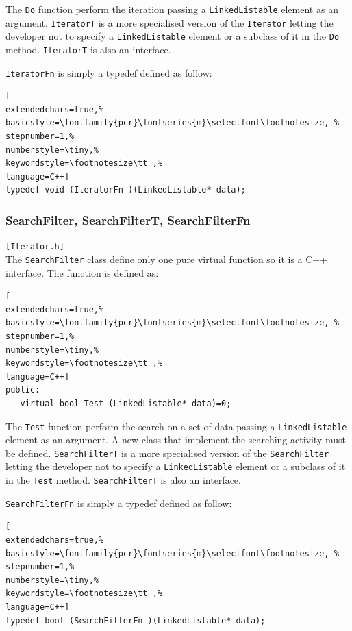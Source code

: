 The \texttt{Do} function perform the iteration passing a \texttt{LinkedListable} element as an argument. 
\texttt{IteratorT} is a more specialised version of the \texttt{Iterator} letting the developer not to specify a \texttt{LinkedListable} element or a subclass of it in the \texttt{Do} method. \texttt{IteratorT} is also an interface.

\texttt{IteratorFn} is simply a typedef defined as follow:

\begin{lstlisting}[
extendedchars=true,%
basicstyle=\fontfamily{pcr}\fontseries{m}\selectfont\footnotesize, %
stepnumber=1,%
numberstyle=\tiny,%
keywordstyle=\footnotesize\tt ,%
language=C++]
typedef void (IteratorFn )(LinkedListable* data);
\end{lstlisting}



\subsubsection{SearchFilter, SearchFilterT, SearchFilterFn}
\texttt{[Iterator.h]}\\
The \texttt{SearchFilter} class define only one pure virtual function so it is a C++ interface. The function is defined as:

\begin{lstlisting}[
extendedchars=true,%
basicstyle=\fontfamily{pcr}\fontseries{m}\selectfont\footnotesize, %
stepnumber=1,%
numberstyle=\tiny,%
keywordstyle=\footnotesize\tt ,%
language=C++]
public:
   virtual bool Test (LinkedListable* data)=0;
\end{lstlisting}

The \texttt{Test} function perform the search on a set of data passing a \texttt{LinkedListable} element as an argument. A new class that implement the searching activity must be defined.
\texttt{SearchFilterT} is a more specialised version of the \texttt{SearchFilter} letting the developer not to specify a \texttt{LinkedListable} element or a subclass of it in the \texttt{Test} method. \texttt{SearchFilterT} is also an interface.

\texttt{SearchFilterFn} is simply a typedef defined as follow:

\begin{lstlisting}[
extendedchars=true,%
basicstyle=\fontfamily{pcr}\fontseries{m}\selectfont\footnotesize, %
stepnumber=1,%
numberstyle=\tiny,%
keywordstyle=\footnotesize\tt ,%
language=C++]
typedef bool (SearchFilterFn )(LinkedListable* data);
\end{lstlisting}



